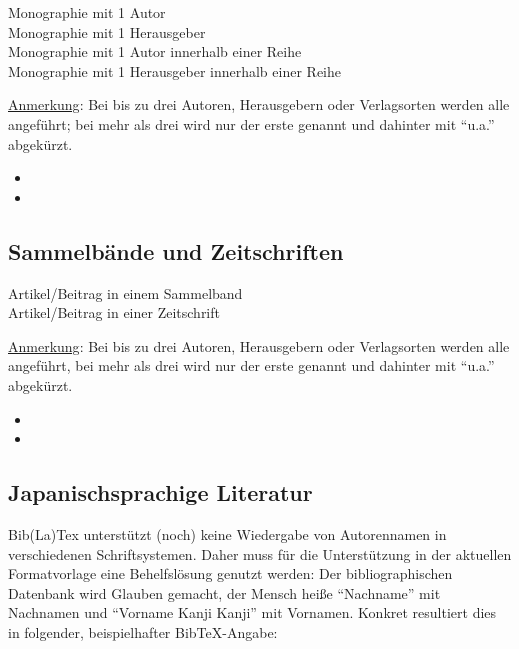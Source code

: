 \documentclass{japuzk}
\begin{document}
\begin{description}
	\item[Monographie mit 1 Autor]
	\item[Monographie mit 1 Herausgeber]
	\item[Monographie mit 1 Autor innerhalb einer Reihe]
	\item[Monographie mit 1 Herausgeber innerhalb einer Reihe]
\end{description}

\underline{Anmerkung}: Bei bis zu drei Autoren, Herausgebern oder Verlagsorten werden alle angeführt; bei mehr als drei wird nur der erste genannt und dahinter mit \enquote{u.a.} abgekürzt.

\begin{itemize}
	\item {}
	\item {}
\end{itemize}

\subsection{Sammelbände und Zeitschriften}

\begin{description}
	\item[Artikel/Beitrag in einem Sammelband]
	\item[Artikel/Beitrag in einer Zeitschrift]
\end{description}

\underline{Anmerkung}: Bei bis zu drei Autoren, Herausgebern oder Verlagsorten werden alle angeführt, bei mehr als drei wird nur der erste genannt und dahinter mit \enquote{u.a.} abgekürzt.

\begin{itemize}
	\item {}
	\item {}
\end{itemize}

\subsection{Japanischsprachige Literatur}

Bib(La)Tex unterstützt (noch) keine Wiedergabe von Autorennamen in verschiedenen Schriftsystemen. Daher muss für die Unterstützung in der aktuellen Formatvorlage eine Behelfslösung genutzt werden: Der bibliographischen Datenbank wird Glauben gemacht, der Mensch heiße \enquote{Nachname} mit Nachnamen und \enquote{Vorname Kanji Kanji} mit Vornamen. Konkret resultiert dies in folgender, beispielhafter BibTeX-Angabe:
\end{document}
